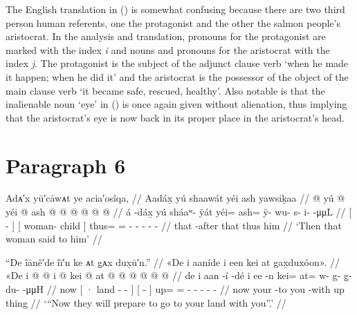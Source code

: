 The English translation in (\lastx) is somewhat confusing because there are two third person human referents, one the protagonist and the other the salmon people’s aristocrat.
In the analysis and translation, pronouns for the protagonist are marked with the index \textit{i} and nouns and pronouns for the aristocrat with the index \textit{j}.
The protagonist is the subject of the adjunct clause verb  ‘when he made it happen; when he did it’ and the aristocrat is the possessor of the object of the main clause verb  ‘it became safe, rescued, healthy’.
Also notable is that the inalienable noun  ‘eye’ in (\lastx) is once again given without alienation, thus implying that the aristocrat’s eye is now back in its proper place in the aristocrat’s head.

\section{Paragraph 6}\label{sec:100-para-6}

\ex\label{ex:100-81-that-woman-said}%
%
\begingl
	\glpreamble	Adᴀ′x yū′cāwᴀt ye acia′osîqa, //
	\glpreamble	Aadáx̱ yú shaawát yéi ash yawsiḵaa //
	\gla	{}  @ {} {} 
		{} yú  @ {} {} 
		yéi @ ash @  @ {} @ {} @ {} @ {} @ {} //
	\glb	{} á -dáx̱ {} 
		{} yú sháaʷ- ÿát {} 
		yéi= ash= ÿ- wu- s- i-  -μμL //
	\glc	{}[  - {}]
		{}[  woman- child {}]
		thus= = - - - -  - //
	\gld	{} that -after {} 
		{} that  {} {} 
		thus him  {} {} {} {} {} //
	\glft	‘Then that woman said to him’
		//
\endgl
\xe

\ex\label{ex:100-82-prepare-to-go}%
%
\begingl
	\glpreamble	“De îānê′de îī′n ke ᴀt g̣ᴀx dux̣ū′n.” //
	\glpreamble	«\!De i aaníde i een kei at gax̱duxóon\!». //
	\gla	«\!De 
		{} i  @ {} @ {} {} 
		{} i  @ {} {}
		kei @ at @  @ {} @ {} @ {} @ {} @ {} //
	\glb	\pqp{}de
		{} i aan -í -dé {}
		{} i ee -n {}
		kei= at= w- g- g̱- du-  -μμH //
	\glc	\pqp{}now
		{}[ · land - - {}]
		{}[   - {}]
		up= = - - - -  - //
	\gld	\pqp{}now
		{} your  {} -to {}
		{} you {} -with {}
		up thing  {} {} {} {} {} //
	\glft	‘“Now they will prepare to go to your land with you”.’
		//
\endgl
\xe

